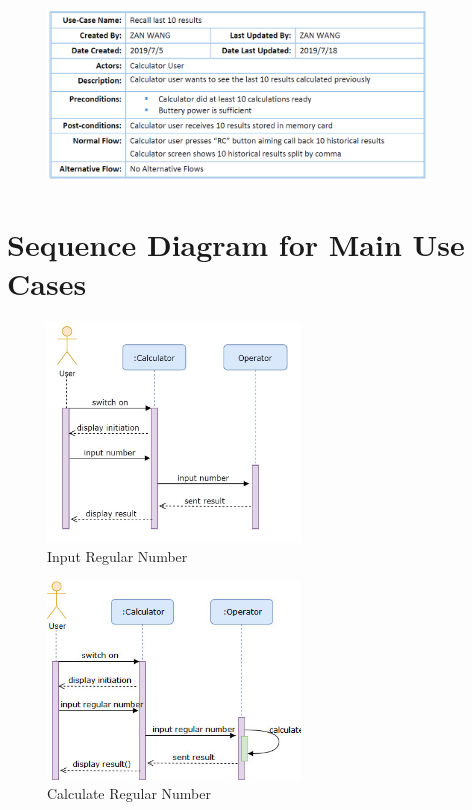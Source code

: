 \begin{figure}[H]
\centering  %
\includegraphics[width=0.9\textwidth]{images/use_case/UC_rl10r.PNG}
\end{figure}



\section{Sequence Diagram for Main Use Cases}

\begin{figure}[H]
\centering  %
\includegraphics[width=0.6\textwidth]{images/SD/ccn.jpg}
\caption{Input Regular Number}
\end{figure}

\begin{figure}[H]
\centering  %
\includegraphics[width=0.6\textwidth]{images/SD/irn.jpg}
\caption{Calculate Regular Number}
\end{figure}

